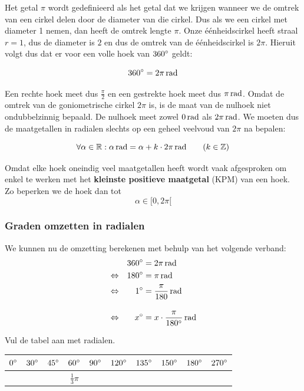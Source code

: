 \documentclass[a4paper,12pt,twoside ]{article}
\begin{document}
Het getal $\pi$ wordt gedefinieerd als het getal dat we krijgen wanneer we de omtrek van een cirkel delen door de diameter van die cirkel. Dus als we een cirkel met diameter 1 nemen, dan heeft de omtrek lengte $\pi$. Onze éénheidscirkel heeft straal $r=1$, dus de diameter is $2$ en dus de omtrek van de éénheidscirkel is $2\pi$. Hieruit volgt dus dat er voor een volle hoek van $360^\circ$ geldt:
\begin{mdframed}
$$360\degree = 2\pi \rad$$
\end{mdframed}


Een rechte hoek meet dus $\frac{\pi}{2}$ en een gestrekte hoek meet dus $\pi \rad$. Omdat de omtrek van de goniometrische cirkel $2\pi$ is, is de maat van de nulhoek niet ondubbelzinnig bepaald. De nulhoek meet zowel $0 \rad$ als $2\pi \rad$. We moeten dus de maatgetallen in radialen slechts op een geheel veelvoud van $2\pi$ na bepalen:

\begin{mdframed}
$$\forall \alpha \in \mathbb{R} : \alpha \rad = \alpha + k \cdot 2\pi \rad  \qquad (k\in \mathbb{Z})$$
\end{mdframed}

Omdat elke hoek oneindig veel maatgetallen heeft wordt vaak afgesproken om enkel te werken met het {\bf kleinste positieve maatgetal} (KPM) van een hoek. Zo beperken we de hoek dan tot
$$\alpha \in [0, 2\pi[$$


\subsubsection{Graden omzetten in radialen}
We kunnen nu de omzetting berekenen met behulp van het volgende verband:
\begin{alignat*}{2}
     &&360\degree &= 2\pi \rad\\
\LRA &&180\degree &= \pi \rad\\
\LRA &&  1\degree &= \frac{\pi}{180} \rad\\[1em]
\LRA &&  x\degree &= x\cdot\frac{\pi}{180\degree} \rad
\end{alignat*}

\begin{oefening}
Vul de tabel aan met radialen.
\begin{center}
  \begin{tabular}{c|c|c|c|c|c|c|c|c|c}
    $0^\circ$ & $30^\circ$ & $45^\circ$ & $60^\circ$ &$90^\circ$ &$120^\circ$ &$135^\circ$ &$150^\circ$ &$180^\circ$ & $270^\circ$ \\
    \hline
   &&&$\frac{1}{3}\pi$&&&&&&\\
  \end{tabular}
\end{center}
\end{oefening}
\end{document}
